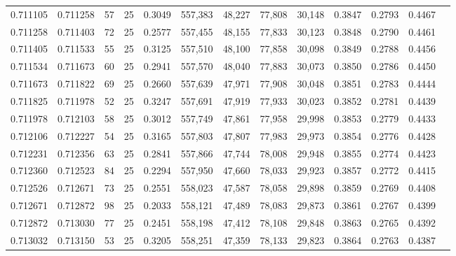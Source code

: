 \begin{tabular}{rrrrrrrrrrrrr}
0.711105 & 0.711258 &    57 &  25 &                                     0.3049 & 557,383 &  48,227 &  77,808 &  30,148 & 0.3847 & 0.2793 & 0.4467 \\
0.711258 & 0.711403 &    72 &  25 &                                     0.2577 & 557,455 &  48,155 &  77,833 &  30,123 & 0.3848 & 0.2790 & 0.4461 \\
0.711405 & 0.711533 &    55 &  25 &                                     0.3125 & 557,510 &  48,100 &  77,858 &  30,098 & 0.3849 & 0.2788 & 0.4456 \\
0.711534 & 0.711673 &    60 &  25 &                                     0.2941 & 557,570 &  48,040 &  77,883 &  30,073 & 0.3850 & 0.2786 & 0.4450 \\
0.711673 & 0.711822 &    69 &  25 &                                     0.2660 & 557,639 &  47,971 &  77,908 &  30,048 & 0.3851 & 0.2783 & 0.4444 \\
0.711825 & 0.711978 &    52 &  25 &                                     0.3247 & 557,691 &  47,919 &  77,933 &  30,023 & 0.3852 & 0.2781 & 0.4439 \\
0.711978 & 0.712103 &    58 &  25 &                                     0.3012 & 557,749 &  47,861 &  77,958 &  29,998 & 0.3853 & 0.2779 & 0.4433 \\
0.712106 & 0.712227 &    54 &  25 &                                     0.3165 & 557,803 &  47,807 &  77,983 &  29,973 & 0.3854 & 0.2776 & 0.4428 \\
0.712231 & 0.712356 &    63 &  25 &                                     0.2841 & 557,866 &  47,744 &  78,008 &  29,948 & 0.3855 & 0.2774 & 0.4423 \\
0.712360 & 0.712523 &    84 &  25 &                                     0.2294 & 557,950 &  47,660 &  78,033 &  29,923 & 0.3857 & 0.2772 & 0.4415 \\
0.712526 & 0.712671 &    73 &  25 &                                     0.2551 & 558,023 &  47,587 &  78,058 &  29,898 & 0.3859 & 0.2769 & 0.4408 \\
0.712671 & 0.712872 &    98 &  25 &                                     0.2033 & 558,121 &  47,489 &  78,083 &  29,873 & 0.3861 & 0.2767 & 0.4399 \\
0.712872 & 0.713030 &    77 &  25 &                                     0.2451 & 558,198 &  47,412 &  78,108 &  29,848 & 0.3863 & 0.2765 & 0.4392 \\
0.713032 & 0.713150 &    53 &  25 &                                     0.3205 & 558,251 &  47,359 &  78,133 &  29,823 & 0.3864 & 0.2763 & 0.4387 \\

\end{tabular}
